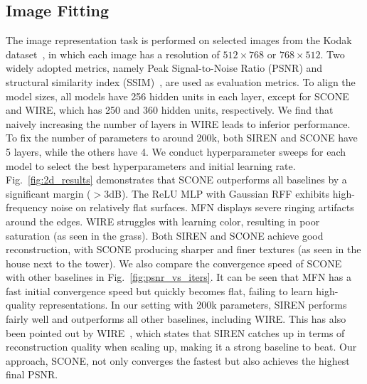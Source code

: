 \documentclass[letterpaper]{article} %
\begin{document}
\subsection{Image Fitting}
\label{subsec:exp_image}
The image representation task is performed on selected images from the Kodak dataset~\cite{kodak}, in which each image has a resolution of $512\times768$ or $768\times512$. Two widely adopted metrics, namely Peak Signal-to-Noise Ratio (PSNR) and structural similarity index (SSIM)~\cite{wang2004image}, are used as evaluation metrics. To align the model sizes, all models have 256 hidden units in each layer, except for SCONE and WIRE, which has 250 and 360 hidden units, respectively. We find that naively increasing the number of layers in WIRE leads to inferior performance. To fix the number of parameters to around 200k, both SIREN and SCONE have 5 layers, while the others have 4. We conduct hyperparameter sweeps for each model to select the best hyperparameters and initial learning rate. Fig.~\ref{fig:2d_results} demonstrates that SCONE outperforms all baselines by a significant margin ($>3$dB). The ReLU MLP with Gaussian RFF exhibits high-frequency noise on relatively flat surfaces. MFN displays severe ringing artifacts around the edges. WIRE struggles with learning color, resulting in poor saturation (as seen in the grass). Both SIREN and SCONE achieve good reconstruction, with SCONE producing sharper and finer textures (as seen in the house next to the tower). We also compare the convergence speed of SCONE with other baselines in Fig.~\ref{fig:psnr_vs_iters}. It can be seen that MFN has a fast initial convergence speed but quickly becomes flat, failing to learn high-quality representations. In our setting with 200k parameters, SIREN performs fairly well and outperforms all other baselines, including WIRE. This has also been pointed out by WIRE~\cite{saragadam2023wire}, which states that SIREN catches up in terms of reconstruction quality when scaling up, making it a strong baseline to beat. Our approach, SCONE, not only converges the fastest but also achieves the highest final PSNR.
\end{document}
